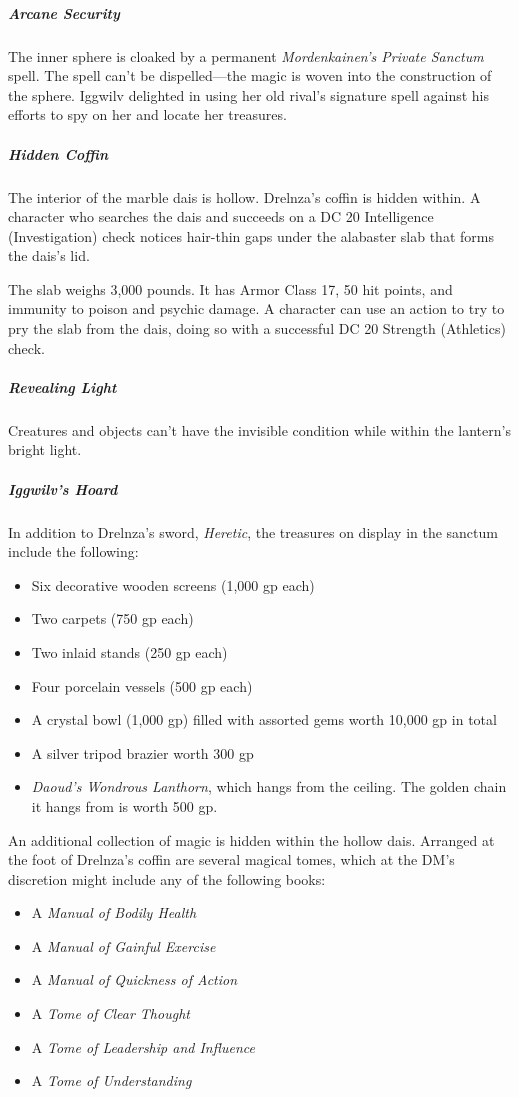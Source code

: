 \documentclass[10pt,a4paper,twoside,bg=print,twocolumn,openany,nodeprecatedcode]{dndbook}
\begin{document}
\subparagraph{Arcane Security}
The inner sphere is cloaked by a permanent \textit{Mordenkainen's Private Sanctum} spell. The spell can't be dispelled—the magic is woven into the construction of the sphere. Iggwilv delighted in using her old rival's signature spell against his efforts to spy on her and locate her treasures.

\subparagraph{Hidden Coffin}
The interior of the marble dais is hollow. Drelnza's coffin is hidden within. A character who searches the dais and succeeds on a DC 20 Intelligence (Investigation) check notices hair-thin gaps under the alabaster slab that forms the dais's lid.

The slab weighs 3,000 pounds. It has Armor Class 17, 50 hit points, and immunity to poison and psychic damage. A character can use an action to try to pry the slab from the dais, doing so with a successful DC 20 Strength (Athletics) check.

\subparagraph{Revealing Light}
Creatures and objects can't have the invisible condition while within the lantern's bright light.

\subparagraph{Iggwilv's Hoard}
In addition to Drelnza's sword, \textit{Heretic}, the treasures on display in the sanctum include the following:


\begin{itemize}
\item Six decorative wooden screens (1,000 gp each)
\item Two carpets (750 gp each)
\item Two inlaid stands (250 gp each)
\item Four porcelain vessels (500 gp each)
\item A crystal bowl (1,000 gp) filled with assorted gems worth 10,000 gp in total
\item A silver tripod brazier worth 300 gp
\item \textit{Daoud's Wondrous Lanthorn}, which hangs from the ceiling. The golden chain it hangs from is worth 500 gp.
\end{itemize}

An additional collection of magic is hidden within the hollow dais. Arranged at the foot of Drelnza's coffin are several magical tomes, which at the DM's discretion might include any of the following books:


\begin{itemize}
\item A \textit{Manual of Bodily Health}
\item A \textit{Manual of Gainful Exercise}
\item A \textit{Manual of Quickness of Action}
\item A \textit{Tome of Clear Thought}
\item A \textit{Tome of Leadership and Influence}
\item A \textit{Tome of Understanding}
\end{itemize}
\end{document}
